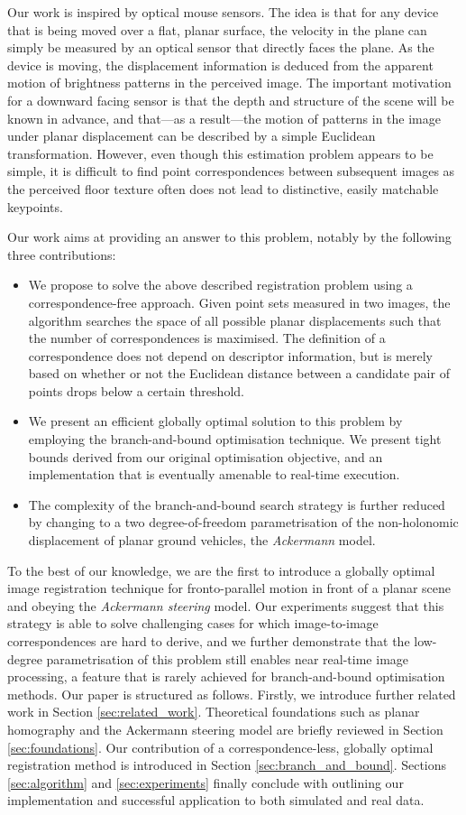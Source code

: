 \documentclass[letterpaper, 10 pt, conference]{ieeeconf}  %
\begin{document}
Our work is inspired by optical mouse sensors. The idea is that for any device that is being moved over a flat, planar surface, the velocity in the plane can simply be measured by an optical sensor that directly faces the plane. As the device is moving, the displacement information is deduced from the apparent motion of brightness patterns in the perceived image. The important motivation for a downward facing sensor is that the depth and structure of the scene will be known in advance, and that---as a result---the motion of patterns in the image under planar displacement can be described by a simple Euclidean transformation. However, even though this estimation problem appears to be simple, it is difficult to find point correspondences between subsequent images as the perceived floor texture often does not lead to distinctive, easily matchable keypoints.

Our work aims at providing an answer to this problem, notably by the following three contributions:
%
\begin{itemize}
\item We propose to solve the above described registration problem using a correspondence-free approach. Given point sets measured in two images,  the algorithm searches the space of all possible planar displacements such that the number of correspondences is maximised. The definition of a correspondence does not depend on descriptor information, but is merely based on whether or not the Euclidean distance between a candidate pair of points drops below a certain threshold.
\item We present an efficient globally optimal solution to this problem by employing the branch-and-bound optimisation technique. We present tight bounds derived from our original optimisation objective, and an implementation that is eventually amenable to real-time execution.
\item The complexity of the branch-and-bound search strategy is further reduced by changing to a two degree-of-freedom parametrisation of the non-holonomic displacement of planar ground vehicles, the \textit{Ackermann} model.
\end{itemize}
%
To the best of our knowledge, we are the first to introduce a globally optimal image registration technique for fronto-parallel motion in front of a planar scene and obeying the \textit{Ackermann steering} model. Our experiments suggest that this strategy is able to solve challenging cases for which image-to-image correspondences are hard to derive, and we further demonstrate that the low-degree parametrisation of this problem still enables near real-time image processing, a feature that is rarely achieved for branch-and-bound optimisation methods. Our paper is structured as follows. Firstly, we introduce further related work in Section \ref{sec:related_work}. Theoretical foundations such as planar homography and the Ackermann steering model are briefly reviewed in Section \ref{sec:foundations}. Our contribution of a correspondence-less, globally optimal registration method is introduced in Section \ref{sec:branch_and_bound}. Sections \ref{sec:algorithm} and \ref{sec:experiments} finally conclude with outlining our implementation and successful application to both simulated and real data.
\end{document}
